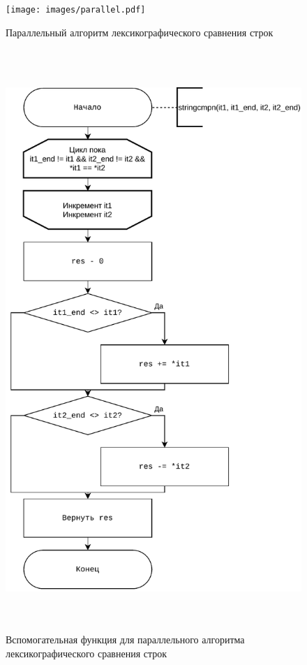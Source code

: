         \begin{figure}
            \centering
            \texttt{[image: images/parallel.pdf]}
            \caption{Параллельный алгоритм лексикографического сравнения строк}
            \label{fig:parallel}
        \end{figure}
        
        \begin{figure}
            \centering
            \includegraphics[width=15cm,height=22cm,keepaspectratio]{images/parallel_sub.pdf}
            \caption{Вспомогательная функция для параллельного алгоритма лексикографического сравнения строк}
            \label{fig:parallel_sub}
        \end{figure}
        
